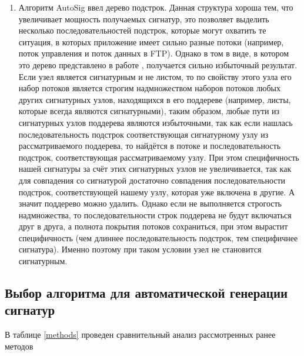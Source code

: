 \begin{enumerate}
    \item
    Алгоритм AutoSig ввел дерево подстрок.
    Данная структура хороша тем, что увеличивает мощность получаемых сигнатур,
    это позволяет выделить несколько последовательностей подстрок, которые могут охватить те ситуация, в которых
    приложение имеет сильно разные потоки (например, поток управления и поток данных в FTP).
    Однако в том в виде, в котором это дерево представлено в работе \cite{ye2009autosig}, получается сильно избыточный результат.
    Если узел является сигнатурным и не листом, то по свойству этого узла его набор потоков является строгим надмножеством
    наборов потоков любых других сигнатурных узлов, находящихся в его поддереве (например, листы, которые всегда являются сигнатурными),
    таким образом, любые пути из сигнатурных узлов поддерева являются избыточными, так как если нашлась последовательность подстрок
    соответствующая сигнатурному узлу из рассматриваемого поддерева,
    то найдётся в потоке и последовательность подстрок, соответствующая рассматриваемому узлу.
    При этом специфичность нашей сигнатуры за счёт этих сигнатурных узлов не увеличивается,
    так как для совпадения со сигнатурой достаточно совпадения последовательности подстрок,
    соответствующей нашему узлу, которая уже включена в другие.
    А значит поддерево можно удалить. Однако если не выполняется строгость надмножества, то последовательности строк
    поддерева не будут включаться друг в друга, а полнота покрытия потоков сохраниться,
    при этом вырастит специфичность (чем длиннее последовательность подстрок, тем специфичнее сигнатура).
    Именно поэтому при таком условии узел не становится сигнатурным.
\end{enumerate}

\subsection{Выбор алгоритма для автоматической генерации сигнатур}

В таблице \ref{methods} проведен сравнительный анализ рассмотренных ранее методов

